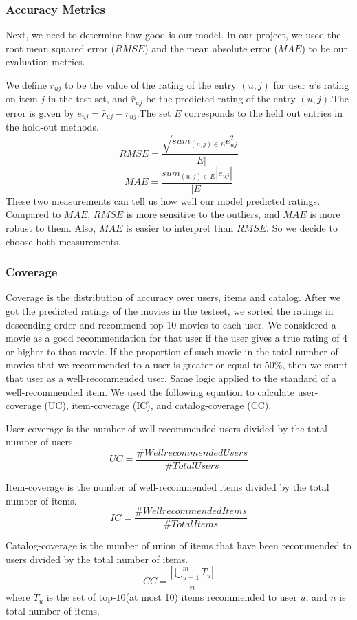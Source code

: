 \documentclass[12pt,journal,compsoc]{IEEEtran}
\begin{document}
\subsubsection{Accuracy Metrics}

Next, we need to determine how good is our model. In our project, we used the root mean squared error ($RMSE$) and the mean absolute error ($MAE$) to be our evaluation metrics.

We define $r_{uj}$ to be the value of the rating of the entry $(u, j)$ for user $u$'s rating on item $j$ in the test set, and $\hat r_{uj}$ be the predicted rating of the entry $(u,j)$.The error is given by $e_{uj} = \hat r_{uj} - r_{uj}$.The set $E$ corresponds to the held out entries in the hold-out methods.
$$RMSE = \frac{\sqrt{sum_{(u,j) \in E}e_{uj}^2}}{|E|}$$
$$MAE = \frac{sum_{(u,j) \in E}|e_{uj}|}{|E|}$$
These two measurements can tell us how well our model predicted ratings. Compared to $MAE$, $RMSE$ is more sensitive to the outliers, and $MAE$ is more robust to them. Also, $MAE$ is easier to interpret than $RMSE$. So we decide to choose both measurements.


\subsubsection{Coverage}

Coverage is the distribution of accuracy over users, items and catalog.
After we got the predicted ratings of the movies in the testset, we sorted the ratings in descending order and recommend top-10 movies to each user. We considered a movie as a good recommendation for that user if the user gives a true rating of 4 or higher to that movie. If the proportion of such movie in the total number of movies that we recommended to a user is greater or equal to 50\%, then we count that user as a well-recommended user. Same logic applied to the standard of a well-recommended item. We used the following equation to calculate user-coverage (UC), item-coverage (IC), and catalog-coverage (CC).

User-coverage is the number of well-recommended users divided by the total number of users.
$$ UC = \frac{\# Well recommended Users}{\# Total Users}$$


Item-coverage is the number of well-recommended items divided by the total number of items.
$$ IC = \frac{\# Well recommended Items}{\# Total Items}$$

Catalog-coverage is the number of union of items that have been recommended to users divided by the total number of items.
$$CC = \frac{|\bigcup_{u=1}^mT_u|}{n}$$
where $T_u$ is the set of top-$10$(at most 10) items recommended to user $u$, and $n$ is total number of items.
\end{document}
